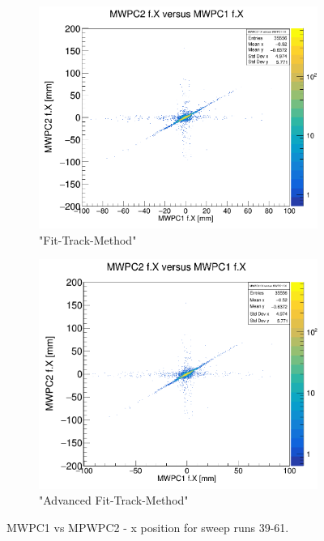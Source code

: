 \documentclass[12pt, letterpaper]{article}
\begin{document}
\begin{figure}[!htbp]
\begin{subfigure}{.5\textwidth}
\end{subfigure}
\begin{subfigure}{.5\textwidth}
  \centering
  \includegraphics[width=.9\linewidth]{plot_imgs/mw2_mw1_fit.png} 
  \caption{"Fit-Track-Method"}
  \label{fig:sub-second}
\end{subfigure}
\begin{subfigure}{.5\textwidth}
  \centering
  \includegraphics[width=.9\linewidth]{plot_imgs/mw2_mw1_alpha.png} 
  \caption{"Advanced Fit-Track-Method"}
  \label{fig:sub-second}
\end{subfigure}
\caption{MWPC1 vs MPWPC2 - x position for sweep runs 39-61.}
\label{fig:fig}
\end{figure}
\FloatBarrier
\clearpage
\end{document}

